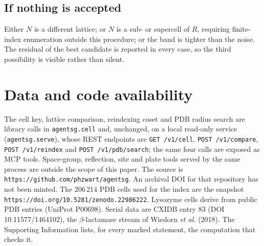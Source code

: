 \documentclass[preprint,pdf]{iucr}          %
\begin{document}
\subsection{If nothing is accepted}
Either $N$ is a different lattice; or $N$ is a sub- or supercell of $R$, requiring finite-index enumeration outside this procedure; or the band is tighter than the noise. The residual of the best candidate is reported in every case, so the third possibility is visible rather than silent.

\section*{Data and code availability}
The cell key, lattice comparison, reindexing coset and PDB radius search are library calls in \texttt{agentsg.cell} and, unchanged, on a local read-only service (\texttt{agentsg.serve}), whose REST endpoints are \texttt{GET /v1/cell}, \texttt{POST /v1/compare}, \texttt{POST /v1/reindex} and \texttt{POST /v1/pdb/search}; the same four calls are exposed as MCP tools. Space-group, reflection, site and plate tools served by the same process are outside the scope of this paper. The source is \texttt{https://github.com/phzwart/agentsg}. An archival DOI for that repository has not been minted. The 206\,214 PDB cells used for the index are the snapshot \texttt{https://doi.org/10.5281/zenodo.22986222}. Lysozyme cells derive from public PDB entries (UniProt P00698). Serial data are CXIDB entry 83 (DOI 10.11577/1464102), the $\beta$-lactamase stream of Wiedorn \emph{et al.} (2018). The Supporting Information lists, for every marked statement, the computation that checks it.

\end{document}
